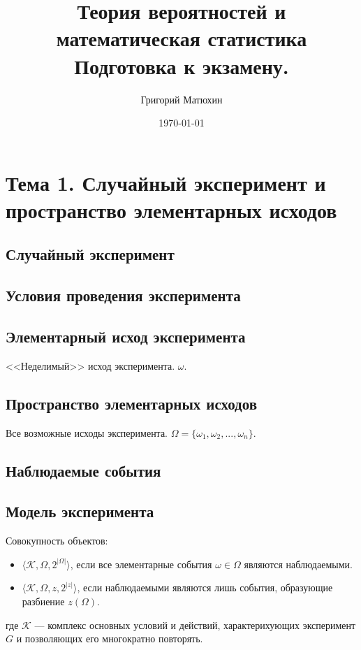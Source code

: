 \documentclass[12pt]{article}
\author{Григорий Матюхин}
\date{\today}
\title{
	Теория вероятностей и математическая статистика \\
	\large Подготовка к экзамену.
}
\begin{document}
\maketitle
\newpage
\tableofcontents
\newpage

\section{Тема 1. Случайный эксперимент и пространство элементарных исходов}

\subsection{Случайный эксперимент}

\subsection{Условия проведения эксперимента}

\subsection{Элементарный исход эксперимента}
<<Неделимый>> исход эксперимента. $\omega$.

\subsection{Пространство элементарных исходов}
Все возможные исходы эксперимента. $\Omega = \{\omega_1, \omega_2, ..., \omega_n\}$.

\subsection{Наблюдаемые события}

\subsection{Модель эксперимента}
Совокупность объектов:
\begin{itemize}
	\item $\langle \mathcal{K}, \Omega, 2^{|\Omega|}\rangle$,
	      если все элементарные события $\omega \in \Omega$ являются наблюдаемыми.
	\item $\langle \mathcal{K}, \Omega, \mathit{z}, 2^{|\mathit{z}|}\rangle$,
	      если наблюдаемыми являются лишь события, образующие разбиение $\mathit{z}(\Omega)$.
\end{itemize}
где $\mathcal{K}$ --- комплекс основных условий и действий, характерихующих эксперимент $G$ и позволяющих его многократно повторять.
\end{document}
